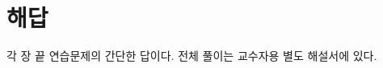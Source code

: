 \chapter{해답}
\label{sec:answers}

각 장 끝 연습문제의 간단한 답이다. 전체 풀이는 교수자용 별도 해설서에 있다.























